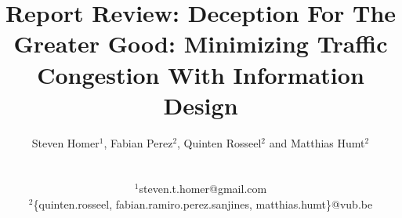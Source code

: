 \title{Report Review: Deception For The Greater Good: Minimizing Traffic Congestion With Information Design}
\author{\small Steven Homer$^1$, Fabian Perez$^2$, Quinten Rosseel$^2$ and Matthias Humt$^2$\\
\date{}
\mbox{}\\
\small $^1$steven.t.homer@gmail.com\\
\small $^2$\{quinten.rosseel, fabian.ramiro.perez.sanjines, matthias.humt\}@vub.be}
